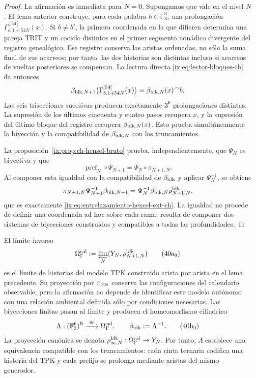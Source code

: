 \begin{proof}
La afirmación es inmediata para \(N=0\). Supongamos que vale en el nivel
\(N\). El lema anterior construye, para cada palabra
\(b\in\mathbb F_3^6\), una prolongación
    \(\Gamma_{b,1+54N}^{[54]}(x)\). Si \(b\ne b'\), la primera coordenada en la
que difieren determina una pareja TRIT y un cociclo distintos en el primer
segmento nonádico divergente del registro genealógico. Ese registro conserva
las aristas ordenadas, no sólo la suma final de sus acarreos; por tanto, las dos
historias son distintas incluso si acarreos de vueltas posteriores se
compensan. La lectura directa \eqref{ix:eq:lector-bloques-ch} da entonces
\begin{equation}
 \beta_{{\rm blk},N+1}
 \bigl(\Gamma_{b,1+54N}^{[54]}(x)\bigr)
 =\beta_{{\rm blk},N}(x)^\frown b.
 \label{ix:eq:beta-concatenacion-demostrada-ch}
\end{equation}
Las seis trisecciones sucesivas producen exactamente \(3^6\) prolongaciones
distintas. La supresión de los últimos cincuenta y cuatro pasos recupera
\(x\), y la supresión del último bloque del registro recupera
\(\beta_{{\rm blk},N}(x)\). Esto prueba simultáneamente la biyección y la
compatibilidad de \(\beta_{{\rm blk},N}\) con los truncamientos.

La proposición~\ref{ix:prop:ch-hensel-bruto} prueba, independientemente, que
\(\Psi_N\) es biyectiva y que
\[
 \operatorname{pref}_N\circ\Psi_{N+1}
 =\Psi_N\circ\pi_{N+1,N}.
\]
Al componer esta igualdad con la compatibilidad de \(\beta_{\rm blk}\) y
aplicar \(\Psi_N^{-1}\), se obtiene
\[
 \pi_{N+1,N}\Psi_{N+1}^{-1}\beta_{{\rm blk},N+1}
 =\Psi_N^{-1}\beta_{{\rm blk},N}\rho^{\rm blk}_{N+1,N},
\]
que es exactamente \eqref{ix:eq:entrelazamiento-hensel-ext-ch}. La igualdad no
procede de definir una coordenada ad hoc sobre cada rama: resulta de componer
dos sistemas de biyecciones construidos y compatibles a todas las
profundidades.
\end{proof}

El límite inverso
\[
 \Omega_\Gamma^{\rm cal}:=
 \varprojlim_N(Y_N,\rho^{\rm blk}_{N+1,N})
\tag{40a$_0$}
\label{ix:eq:omega-gamma-catalogal-ch}
\]
es el límite de historias del modelo TPK construido arista por
arista en el lema precedente. Su proyección por \(\pi_{\rm obs}\) conserva
las configuraciones del calendario observable, pero la afirmación no depende
de identificar este modelo autónomo con una relación ambiental definida sólo
por condiciones necesarias. Las biyecciones finitas pasan
al límite y producen el homeomorfismo cilíndrico
\[
 \Lambda:(\mathbb F_3^6)^{\mathbb N}
 \xrightarrow{\ \cong\ }\Omega_\Gamma^{\rm cal},
 \qquad
 \beta_{\rm blk}:=\Lambda^{-1}.
\tag{40b$_0$}
\label{ix:eq:homeomorfismo-calibrado-ch}
\]
La proyección canónica se denota
\(\rho^{\rm blk}_{\infty,N}:\Omega_\Gamma^{\rm cal}\to Y_N\).
Por tanto, \(\Lambda\) establece una equivalencia compatible con los
truncamientos: cada cinta ternaria codifica una historia del TPK y cada
prefijo se prolonga mediante aristas del mismo generador.

